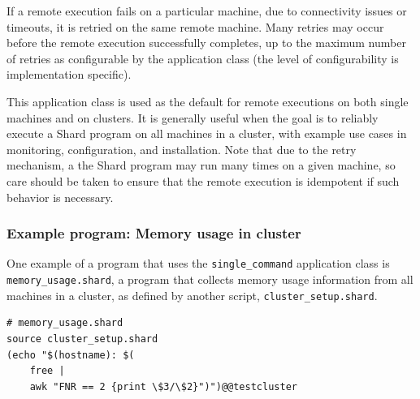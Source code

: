 \documentclass[twoside]{report}
\begin{document}
If a remote execution fails on a particular machine, due to connectivity issues or timeouts, it is retried on the same remote machine.
Many retries may occur before the remote execution successfully completes, up to the maximum number of retries as configurable by the application class (the level of configurability is implementation specific).

This application class is used as the default for remote executions on both single machines and on clusters.
It is generally useful when the goal is to reliably execute a Shard program on all machines in a cluster, with example use cases in monitoring, configuration, and installation.
Note that due to the retry mechanism, a the Shard program may run many times on a given machine, so care should be taken to ensure that the remote execution is idempotent if such behavior is necessary.

\subsubsection{Example program: Memory usage in cluster}

One example of a program that uses the \texttt{single\_command} application class is \texttt{memory\_usage.shard}, a program that collects memory usage information from all machines in a cluster, as defined by another script, \texttt{cluster\_setup.shard}.

\begin{lstlisting}[language=Shard]
# memory_usage.shard
source cluster_setup.shard
(echo "$(hostname): $(
    free |
    awk "FNR == 2 {print \$3/\$2}")")@@testcluster
\end{lstlisting}
\end{document}
